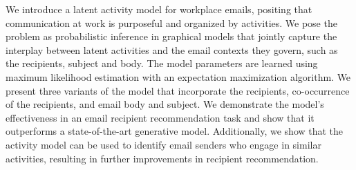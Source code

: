 We introduce a latent activity model for workplace emails, positing that communication at work is purposeful and organized by activities. We pose the problem as probabilistic inference in graphical models that jointly capture the interplay between latent activities and the email contexts they govern, such as the recipients, subject and body. The model parameters are learned using maximum likelihood estimation with an expectation maximization algorithm. We present three variants of the model that incorporate the recipients, co-occurrence of the recipients, and email body and subject. We demonstrate the model's effectiveness in an email recipient recommendation task and show that it outperforms a state-of-the-art generative model. Additionally, we show that the activity model can be used to identify email senders who engage in similar activities, resulting in further improvements in recipient recommendation.
